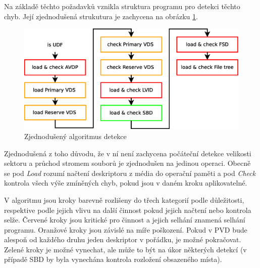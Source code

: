 Na základě těchto požadavků vznikla struktura programu pro detekci těchto chyb. Její zjednodušená strukutura je zachycena na obrázku \ref{fig:steps-detekce}.
 
\begin{figure}[h] 
    \centering
    \includegraphics[scale=0.4]{obrazky/steps1b.eps}
    \caption{Zjednodušený algoritmus detekce}
    \label{fig:steps-detekce}
\end{figure}
Zjednodušená z toho důvodu, že v ní není zachycena počáteční detekce velikosti sektoru a průchod stromem souborů je zjednodušen na jedinou operaci. Obecně se pod \textit{Load} rozumí načtení deskriptoru z média do operační paměti a pod \textit{Check} kontrola všech výše zmíněných chyb, pokud jsou v daném kroku aplikovatelné.

V algoritmu jsou kroky barevně rozlišeny do třech kategorií podle důležitosti, respektive podle jejich vlivu na další činnost pokud jejich načtení nebo kontrola selže. Červené kroky jsou kritické pro činnost a jejich selhání znamená selhání programu. Oranžové kroky jsou závislé na míře poškození. Pokud v PVD bude alespoň od každého druhu jeden deskriptor v pořádku, je možné pokračovat. Zelené kroky je možné vynechat, ale může to být na úkor některých detekcí (v případě SBD by byla vynechána kontrola rozložení obsazeného místa).

